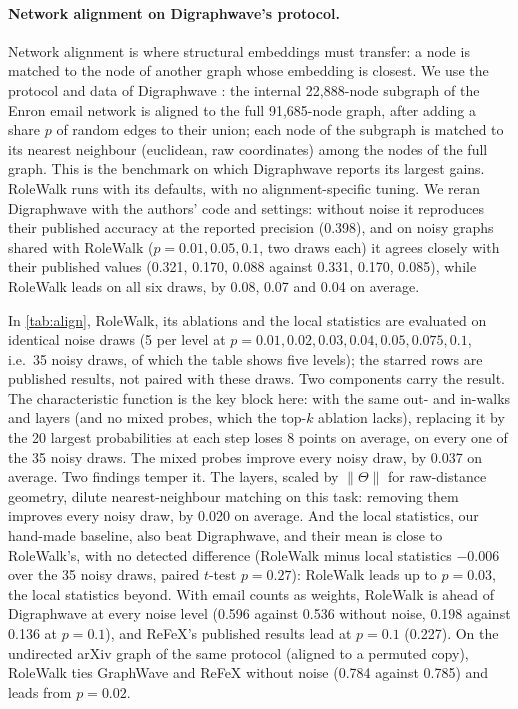 \documentclass[10pt]{article}
\theoremstyle{definition}
\newcommand{\nTh}{\lVert\Theta\rVert}
\begin{document}
\paragraph{Network alignment on Digraphwave's protocol.}
Network alignment is where structural embeddings must transfer: a node is matched to the node of another graph whose embedding is closest.
We use the protocol and data of Digraphwave \citep{ceylan2022}: the internal 22,888-node subgraph of the Enron email network is aligned to the full 91,685-node graph, after adding a share $p$ of random edges to their union; each node of the subgraph is matched to its nearest neighbour (euclidean, raw coordinates) among the nodes of the full graph.
This is the benchmark on which Digraphwave reports its largest gains.
RoleWalk runs with its defaults, with no alignment-specific tuning.
We reran Digraphwave with the authors' code and settings: without noise it reproduces their published accuracy at the reported precision (0.398), and on noisy graphs shared with RoleWalk ($p = 0.01, 0.05, 0.1$, two draws each) it agrees closely with their published values (0.321, 0.170, 0.088 against 0.331, 0.170, 0.085), while RoleWalk leads on all six draws, by 0.08, 0.07 and 0.04 on average.

In \cref{tab:align}, RoleWalk, its ablations and the local statistics are evaluated on identical noise draws (5 per level at $p = 0.01, 0.02, 0.03, 0.04, 0.05, 0.075, 0.1$, i.e.\ 35 noisy draws, of which the table shows five levels); the starred rows are published results, not paired with these draws.
Two components carry the result.
The characteristic function is the key block here: with the same out- and in-walks and layers (and no mixed probes, which the top-$k$ ablation lacks), replacing it by the 20 largest probabilities at each step loses 8 points on average, on every one of the 35 noisy draws.
The mixed probes improve every noisy draw, by 0.037 on average.
Two findings temper it.
The layers, scaled by $\nTh$ for raw-distance geometry, dilute nearest-neighbour matching on this task: removing them improves every noisy draw, by 0.020 on average.
And the local statistics, our hand-made baseline, also beat Digraphwave, and their mean is close to RoleWalk's, with no detected difference (RoleWalk minus local statistics $-0.006$ over the 35 noisy draws, paired $t$-test $p = 0.27$): RoleWalk leads up to $p=0.03$, the local statistics beyond.
With email counts as weights, RoleWalk is ahead of Digraphwave at every noise level (0.596 against 0.536 without noise, 0.198 against 0.136 at $p=0.1$), and ReFeX's published results lead at $p=0.1$ (0.227).
On the undirected arXiv graph of the same protocol (aligned to a permuted copy), RoleWalk ties GraphWave and ReFeX without noise (0.784 against 0.785) and leads from $p=0.02$.
\end{document}
